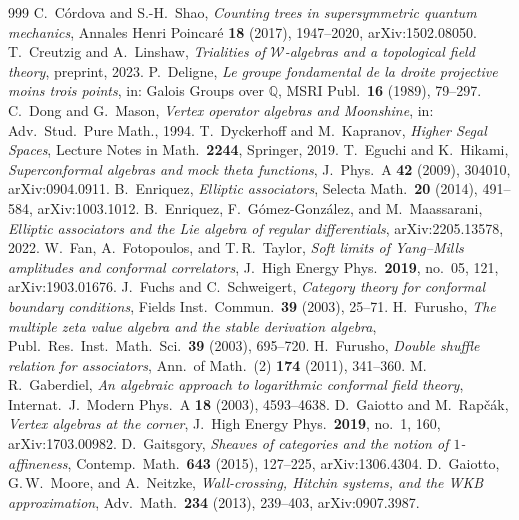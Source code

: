 \begin{thebibliography}{999}
 C.~C\'ordova and S.-H.~Shao, \emph{Counting trees in supersymmetric quantum mechanics}, Annales Henri Poincar\'e \textbf{18} (2017), 1947--2020, arXiv:1502.08050.
 T.~Creutzig and A.~Linshaw, \emph{Trialities of $\mathcal{W}$-algebras and a topological field theory}, preprint, 2023.
 P.~Deligne, \emph{Le groupe fondamental de la droite projective moins trois points}, in: Galois Groups over $\mathbb{Q}$, MSRI Publ.\ \textbf{16} (1989), 79--297.
 C.~Dong and G.~Mason, \emph{Vertex operator algebras and Moonshine}, in: Adv.\ Stud.\ Pure Math., 1994.
 T.~Dyckerhoff and M.~Kapranov, \emph{Higher Segal Spaces}, Lecture Notes in Math.\ \textbf{2244}, Springer, 2019.
 T.~Eguchi and K.~Hikami, \emph{Superconformal algebras and mock theta functions}, J.~Phys.\ A \textbf{42} (2009), 304010, arXiv:0904.0911.
 B.~Enriquez, \emph{Elliptic associators}, Selecta Math.\ \textbf{20} (2014), 491--584, arXiv:1003.1012.
 B.~Enriquez, F.~G\'omez-Gonz\'alez, and M.~Maassarani, \emph{Elliptic associators and the Lie algebra of regular differentials}, arXiv:2205.13578, 2022.
 W.~Fan, A.~Fotopoulos, and T.\,R.~Taylor, \emph{Soft limits of Yang--Mills amplitudes and conformal correlators}, J.~High Energy Phys.\ \textbf{2019}, no.~05, 121, arXiv:1903.01676.
 J.~Fuchs and C.~Schweigert, \emph{Category theory for conformal boundary conditions}, Fields Inst.\ Commun.\ \textbf{39} (2003), 25--71.
 H.~Furusho, \emph{The multiple zeta value algebra and the stable derivation algebra}, Publ.\ Res.\ Inst.\ Math.\ Sci.\ \textbf{39} (2003), 695--720.
 H.~Furusho, \emph{Double shuffle relation for associators}, Ann.\ of Math.\ (2) \textbf{174} (2011), 341--360.
 M.\,R.~Gaberdiel, \emph{An algebraic approach to logarithmic conformal field theory}, Internat.\ J.\ Modern Phys.\ A \textbf{18} (2003), 4593--4638.
 D.~Gaiotto and M.~Rap\v{c}\'ak, \emph{Vertex algebras at the corner}, J.~High Energy Phys.\ \textbf{2019}, no.~1, 160, arXiv:1703.00982.
 D.~Gaitsgory, \emph{Sheaves of categories and the notion of $1$-affineness}, Contemp.\ Math.\ \textbf{643} (2015), 127--225, arXiv:1306.4304.
 D.~Gaiotto, G.\,W.~Moore, and A.~Neitzke, \emph{Wall-crossing, Hitchin systems, and the WKB approximation}, Adv.\ Math.\ \textbf{234} (2013), 239--403, arXiv:0907.3987.

\end{thebibliography}
